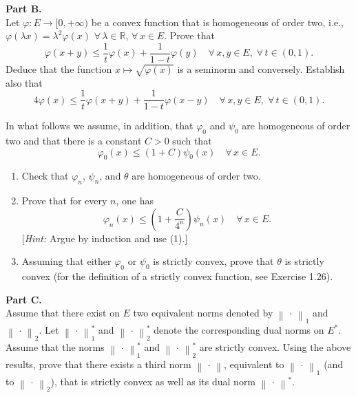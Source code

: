 \documentclass[12pt]{article}
\newcommand{\norm}[1]{\left\|#1\right\|}
\newcommand{\R}{\mathbb{R}}
\begin{document}
\noindent\textbf{Part B.}\\
Let $\varphi : E \to [0,+\infty)$ be a convex function that is homogeneous of order two,
i.e., $\varphi(\lambda x) = \lambda^2 \varphi(x)$ $\forall\, \lambda \in \R$, $\forall\, x \in E$. Prove that
\[
\varphi(x+y) \le \frac{1}{t}\varphi(x) + \frac{1}{1-t}\varphi(y) \quad \forall\, x, y \in E,\; \forall\, t \in (0,1).
\]
Deduce that the function $x \mapsto \sqrt{\varphi(x)}$ is a seminorm and conversely. Establish
also that
\begin{equation}\tag{1}
4\varphi(x) \le \frac{1}{t}\varphi(x+y) + \frac{1}{1-t}\varphi(x-y) \quad \forall\, x,y \in E,\; \forall\, t \in (0,1).
\end{equation}

\noindent In what follows we assume, in addition, that $\varphi_0$ and $\psi_0$ are homogeneous of order
two and that there is a constant $C > 0$ such that
\[
\varphi_0(x) \le (1+C)\psi_0(x) \quad \forall\, x \in E.
\]

\begin{enumerate}
\item Check that $\varphi_n$, $\psi_n$, and $\theta$ are homogeneous of order two.

\item Prove that for every $n$, one has
\[
\varphi_n(x) \le \left(1 + \frac{C}{4^n}\right)\psi_n(x) \quad \forall\, x \in E.
\]
[\textit{Hint:} Argue by induction and use (1).]

\item Assuming that either $\varphi_0$ or $\psi_0$ is strictly convex, prove that $\theta$ is strictly convex
(for the definition of a strictly convex function, see Exercise 1.26).

\]
\end{enumerate}

\noindent\textbf{Part C.}\\
Assume that there exist on $E$ two equivalent norms denoted by $\norm{\,\cdot\,}_1$ and $\norm{\,\cdot\,}_2$.
Let $\norm{\,\cdot\,}_1^*$ and $\norm{\,\cdot\,}_2^*$ denote the corresponding dual norms on $E^*$. Assume that
the norms $\norm{\,\cdot\,}_1^*$ and $\norm{\,\cdot\,}_2^*$ are strictly convex. Using the above results, prove that
there exists a third norm $\norm{\,\cdot\,}$, equivalent to $\norm{\,\cdot\,}_1$ (and to $\norm{\,\cdot\,}_2$), that is strictly convex
as well as its dual norm $\norm{\,\cdot\,}^*$.
\end{document}
